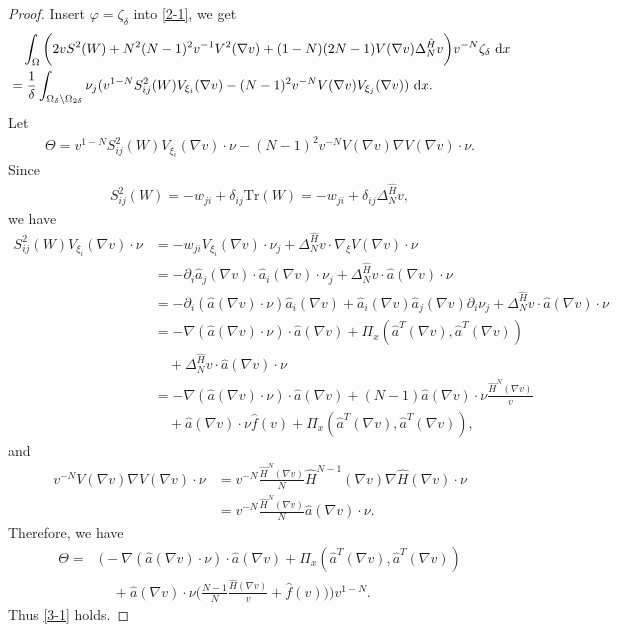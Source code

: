 \documentclass[reqno, 11pt]{amsart} %
\numberwithin{equation}{section}
\theoremstyle{definition}
\newcommand{\pa}{\partial}
\newcommand{\dx}{\textup{d}x}
\begin{document}
\begin{proof}
    Insert $\varphi = \zeta_{\delta}$ into \eqref{2-1}, we get
    \begin{align*}
        & \quad \int_{\Omega} \bigg(  2 v S^2(W) +  N^2(N-1)^2 v^{-1} V^2(\nabla v) + (1-N)(2N-1) V(\nabla v) \Delta_N^{\hat{H}} v \bigg) v^{-N}\zeta_{\delta} \ \dx \\
        &= \frac{1}{\delta} \int_{\Omega_{\delta} \backslash    \Omega_{2 \delta}} \nu_j (v^{1-N} S^2_{ij}(W) V_{\xi_i}(\nabla v) - (N-1)^2 v^{-N} V(\nabla v) V_{\xi_j}(\nabla v) ) \ \dx.
    \end{align*}
    Let
    \begin{align*}
        \Theta = v^{1-N} S^2_{ij}(W) V_{\xi_i}(\nabla v) \cdot \nu
        - (N-1)^2 v^{-N} V(\nabla v) \nabla V(\nabla v) \cdot \nu.
    \end{align*}
    Since
    \begin{align*}
        S^2_{ij}(W) = - w_{ji} + \delta_{ij} \text{Tr}(W) = - w_{ji} + \delta_{ij} \Delta_N^{\hat{H}} v,
    \end{align*}
    we have
    \begin{align*}
        S^2_{ij}(W) V_{\xi_i}(\nabla v) \cdot \nu & = - w_{ji} V_{\xi_i}(\nabla v) \cdot \nu_j + \Delta_N^{\hat{H}} v \cdot \nabla_{\xi} V(\nabla v) \cdot \nu \\
        & = - \pa_i \hat{a}_j(\nabla v) \cdot \hat{a}_i(\nabla v) \cdot \nu_j + \Delta_N^{\hat{H}} v \cdot \hat{a}(\nabla v) \cdot \nu \\
        & = - \pa_i (\hat{a} (\nabla v) \cdot \nu) \hat{a}_i(\nabla v) + \hat{a}_i(\nabla v) \hat{a}_j(\nabla v) \pa_i \nu_j + \Delta_N^{\hat{H}} v \cdot \hat{a}(\nabla v) \cdot \nu \\
        & = - \nabla(\hat{a}(\nabla v) \cdot \nu) \cdot \hat{a}(\nabla v) + \Pi_x(\hat{a}^T(\nabla v), \hat{a}^T(\nabla v)) \\
        &\quad + \Delta_N^{\hat{H}} v \cdot \hat{a}(\nabla v) \cdot \nu  \\
        & = -\nabla(\hat{a}(\nabla v) \cdot \nu) \cdot \hat{a}(\nabla v) + (N-1)\hat{a}(\nabla v) \cdot \nu  \frac{\hat{H}^N(\nabla v)}{v} \\
        & \quad+ \hat{a}(\nabla v) \cdot \nu \hat{f}(v) + \Pi_x(\hat{a}^T(\nabla v), \hat{a}^T(\nabla v)),
    \end{align*}
    and
    \begin{align*}
        v^{-N} V(\nabla v) \nabla V(\nabla v) \cdot \nu & = v^{-N} \frac{\hat{H}^N(\nabla v)}{N} \hat{H}^{N-1}(\nabla v) \nabla \hat{H}(\nabla v) \cdot \nu \\
        & = v^{-N} \frac{\hat{H}^N(\nabla v)}{N} \hat{a}(\nabla v) \cdot  \nu.
    \end{align*}
    Therefore, we have
    \begin{align*}
        \Theta = &\bigg( - \nabla(\hat{a}(\nabla v) \cdot \nu) \cdot \hat{a}(\nabla v) + \Pi _x(\hat{a}^T(\nabla v), \hat{a}^T(\nabla v)) \\
        & \quad + \hat{a}(\nabla v)\cdot \nu \bigg( \frac{N-1}{N} \frac{\hat{H}(\nabla v)}{v} + \hat{f}(v)\bigg)\bigg) v^{1-N}.
    \end{align*}
    Thus \eqref{3-1} holds.
\end{proof}
\end{document}
